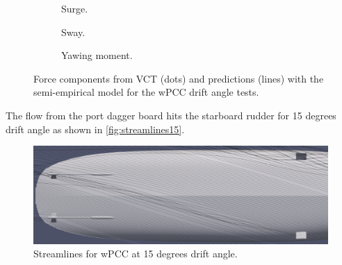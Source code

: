 \begin{figure}[h]
     \centering
     \begin{subfigure}[b]{0.49\textwidth}
         \centering
         
        \caption{Surge.}
        \label{fig:drift_angle_X}
     \end{subfigure}
     \hfill
     \begin{subfigure}[b]{0.49\textwidth}
         \centering
         
        \caption{Sway.}
        \label{fig:drift_angle_Y}
     \end{subfigure}
     \vfill
     \begin{subfigure}[b]{0.49\textwidth}
         \centering
         
        \caption{Yawing moment.}
        \label{fig:drift_angle_N}
     \end{subfigure}
    \caption{Force components from VCT (dots) and predictions (lines) with the semi-empirical model for the wPCC drift angle tests.}
    \label{fig:overshoots_wPCC}
\end{figure}


The flow from the port dagger board hits the starboard rudder for 15 degrees drift angle as shown in \autoref{fig:streamlines15}.
\begin{figure}[h]
    \centering
    \includegraphics[width=\textwidth]{figures/paraview_drift_15.png}
    \caption{Streamlines for wPCC at 15 degrees drift angle.}
    \label{fig:streamlines15}
\end{figure}